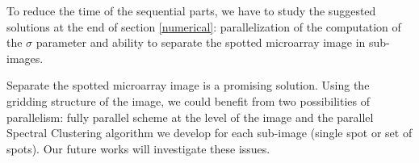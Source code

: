 \documentclass[runningheads,a4paper]{llncs}
\begin{document}
To reduce the time of the sequential parts, we have to study the suggested
solutions at the end of section \ref{numerical}: parallelization of the
computation of the $\sigma$ parameter and ability to separate the spotted
microarray image in sub-images.

Separate the spotted microarray image is a promising solution. Using the
gridding structure of the image, we could benefit from two possibilities of
parallelism: fully parallel scheme at the level of the image and the parallel
Spectral Clustering algorithm we develop for each sub-image (single spot or
set of spots). Our future works will investigate these issues.



\end{document}
